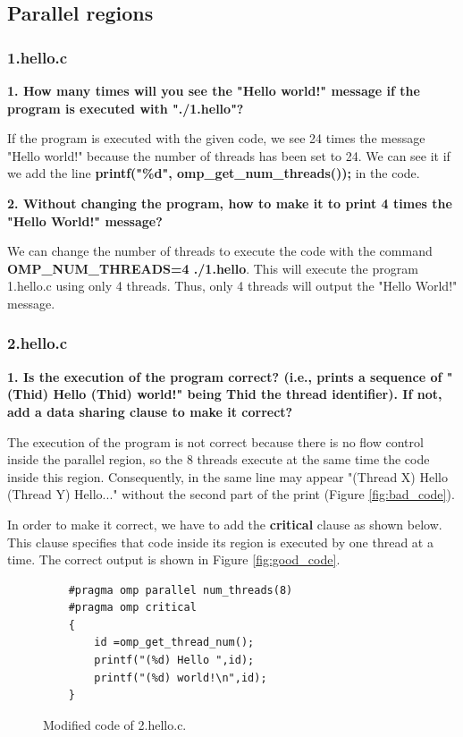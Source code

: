\documentclass[12pt, a4paper]{article}
\begin{document}
\subsection{Parallel regions}

\subsubsection{1.hello.c}

\textbf{1. How many times will you see the "Hello world!" message if the program is executed with "./1.hello"?}

If the program is executed with the given code, we see 24 times the message "Hello world!" because the number of threads has been set to 24. We can see it if we add the line \textbf{printf("\%d", omp\_get\_num\_threads());} in the code.

\hfill

\textbf{2. Without changing the program, how to make it to print 4 times the "Hello World!" message?}

We can change the number of threads to execute the code with the command \textbf{OMP\_NUM\_THREADS=4 ./1.hello}. This will execute the program 1.hello.c using only 4 threads. Thus, only 4 threads will output the "Hello World!" message.

\subsubsection{2.hello.c}

\textbf{1. Is the execution of the program correct? (i.e., prints a sequence of "(Thid) Hello (Thid)
world!" being Thid the thread identifier). If not, add a data sharing clause to make it correct?}

The execution of the program is not correct because there is no flow control inside the parallel region, so the 8 threads execute at the same time the code inside this region. Consequently, in the same line may appear "(Thread X) Hello (Thread Y) Hello..." without the second part of the print (Figure \ref{fig:bad_code}).

In order to make it correct, we have to add the \textbf{critical} clause as shown below. This clause specifies that code inside its region is executed by one thread at a time. The correct output is shown in Figure \ref{fig:good_code}.

\begin{figure}[H]
	\begin{lstlisting}
	#pragma omp parallel num_threads(8)
	#pragma omp critical
	{
	    id =omp_get_thread_num();
	    printf("(%d) Hello ",id);
	    printf("(%d) world!\n",id);
	}
	\end{lstlisting}
	\caption{Modified code of 2.hello.c.}
\end{figure}
\end{document}
